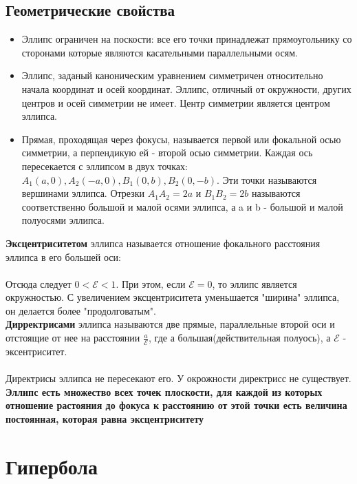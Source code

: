 \documentclass{book}
\begin{document}
\subsection{Геометрические свойства}
\begin{itemize}
    \item Эллипс ограничен на поскости: все его точки принадлежат прямоугольнику со сторонами которые являются касательными параллельными осям.
    \item Эллипс, заданый каноническим уравнением симметричен относительно начала координат и осей координат. Эллипс, отличный от окружности, других центров и осей симметрии не имеет. Центр симметрии является центром эллипса.
    \item Прямая, проходящая через фокусы, называется первой или фокальной осью симметрии, а перпендикую ей - второй осью симметрии. Каждая ось пересекается с эллипсом в двух точках: $A_1(a,0), A_2(-a,0), B_1(0,b), B_2(0,-b)$. Эти точки называются вершинами эллипса. Отрезки $A_1A_2 = 2a$ и $B_1B_2=2b$ называются соответственно большой и малой осями эллипса, а a и b - большой и малой полуосями эллипса.
\end{itemize}
\textbf{Эксцентриситетом} эллипса называется отношение фокального расстояния эллипса в его большей оси:\\
\\
Отсюда следует $0<\mathcal{E}<1$. При этом, если $\mathcal{E}=0$, то эллипс является окружностью. С увеличением эксцентриситета уменьшается "ширина" эллипса, он делается более "продолговатым".\\
\textbf{Дирректрисами} эллипса называются две прямые, параллельные второй оси и отстоящие от нее на расстоянии $\frac{a}{\mathcal{E}}$, где а большая(действительная полуось), а $\mathcal{E}$ - эксентриситет.\\
\\
Директрисы эллипса не пересекают его. У окрожности директрисс не существует.\\
\linebreak
\textbf{Эллипс есть множество всех точек плоскости, для каждой из которых отношение растояния до фокуса к расстоянию от этой точки есть величина постоянная, которая равна эксцентриситету}\\
\section{Гипербола}
\end{document}
